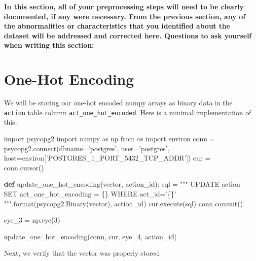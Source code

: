\documentclass[]{report}
\newenvironment{Shaded}{}{}
\newcommand{\KeywordTok}[1]{\textcolor[rgb]{0.00,0.44,0.13}{\textbf{{#1}}}}
\newcommand{\DecValTok}[1]{\textcolor[rgb]{0.25,0.63,0.44}{{#1}}}
\newcommand{\StringTok}[1]{\textcolor[rgb]{0.25,0.44,0.63}{{#1}}}
\newcommand{\ImportTok}[1]{{#1}}
\newcommand{\OperatorTok}[1]{\textcolor[rgb]{0.40,0.40,0.40}{{#1}}}
\newcommand{\BuiltInTok}[1]{{#1}}
\newcommand{\ExtensionTok}[1]{{#1}}
\newcommand{\NormalTok}[1]{{#1}}
\begin{document}
\textbf{In this section, all of your preprocessing steps will need to be
clearly documented, if any were necessary. From the previous section,
any of the abnormalities or characteristics that you identified about
the dataset will be addressed and corrected here. Questions to ask
yourself when writing this section:}

\chapter{One-Hot Encoding}\label{one-hot-encoding-1}

We will be storing our one-hot encoded numpy arrays as binary data in
the \texttt{action} table column \texttt{act\_one\_hot\_encoded}. Here
is a minimal implementation of this.

\begin{Shaded}
\begin{Highlighting}[]
\ImportTok{import} \NormalTok{psycopg2}
\ImportTok{import} \NormalTok{numpy }\ImportTok{as} \NormalTok{np}
\ImportTok{from} \NormalTok{os }\ImportTok{import} \NormalTok{environ}
\NormalTok{conn }\OperatorTok{=} \NormalTok{psycopg2.}\ExtensionTok{connect}\NormalTok{(dbname}\OperatorTok{=}\StringTok{'postgres'}\NormalTok{, }
                        \NormalTok{user}\OperatorTok{=}\StringTok{'postgres'}\NormalTok{,}
                        \NormalTok{host}\OperatorTok{=}\NormalTok{environ[}\StringTok{'POSTGRES_1_PORT_5432_TCP_ADDR'}\NormalTok{])}
\NormalTok{cur }\OperatorTok{=} \NormalTok{conn.cursor()}

\KeywordTok{def} \NormalTok{update_one_hot_encoding(vector, action_id):}
    \NormalTok{sql }\OperatorTok{=} \StringTok{"""}
\StringTok{        UPDATE action }
\StringTok{        SET act_one_hot_encoding = \{\}}
\StringTok{        WHERE act_id='\{\}'}
\StringTok{        """}\NormalTok{.}\BuiltInTok{format}\NormalTok{(psycopg2.Binary(vector), action_id)}
    \NormalTok{cur.execute(sql)}
    \NormalTok{conn.commit()}
    
\NormalTok{eye_3 }\OperatorTok{=} \NormalTok{np.eye(}\DecValTok{3}\NormalTok{)}

\NormalTok{update_one_hot_encoding(conn, cur, eye_4, action_id)}
\end{Highlighting}
\end{Shaded}

Next, we verify that the vector was properly stored.
\end{document}
